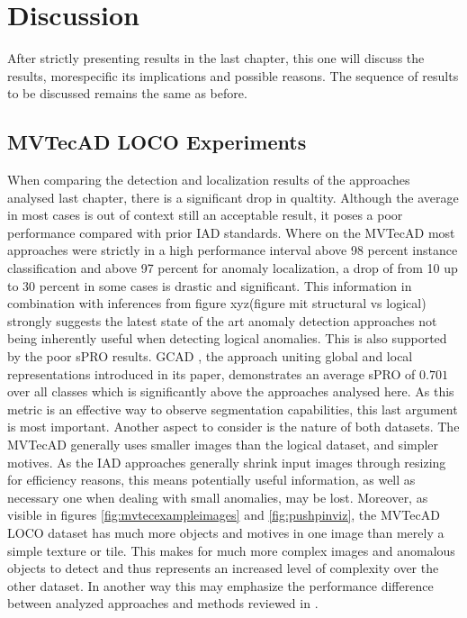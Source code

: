 \chapter{Discussion}
\label{chap:results}

After strictly presenting results in the last chapter, this one will discuss the results, morespecific its implications and possible reasons. 
The sequence of results to be discussed remains the same as before.


\section{MVTecAD LOCO Experiments}
\label{sec:locoresultssota}

When comparing the detection and localization results of the approaches analysed last chapter, there is a significant drop in qualtity. 
Although the average in most cases is out of context still an acceptable result, it poses a poor performance compared with prior 
IAD standards. Where on the MVTecAD \cite{MVTEC_Bergmann_2021} most approaches were strictly in a high performance interval above 98 percent 
instance classification and above 97 percent for anomaly localization, a drop of from 10 up to 30 percent in some cases is drastic and significant. 
This information in combination with inferences from figure xyz(figure mit structural vs logical) strongly suggests the latest state of 
the art anomaly detection approaches not being inherently useful when detecting logical anomalies. This is also supported by the 
poor sPRO results. GCAD \cite{LOCODentsAndScratchesBergmann2022}, the approach uniting global and local representations introduced in its 
paper, demonstrates an average sPRO of $0.701$ over all classes which is significantly above the approaches analysed here. As this metric 
is an effective way to observe segmentation capabilities, this last argument is most important. \newline
Another aspect to consider is the nature of both datasets. The MVTecAD \cite{MVTEC_Bergmann_2021} generally uses smaller images than the 
logical dataset, and simpler motives. As the IAD approaches generally shrink input images through resizing for efficiency reasons, 
this means potentially useful information, as well as necessary one when dealing with small anomalies, may be lost. 
Moreover, as visible in figures \ref{fig:mvtecexampleimages} and \ref{fig:pushpinviz}, the MVTecAD LOCO dataset 
has much more objects and motives in one image than merely a simple texture or tile. This makes for much more complex images and anomalous objects 
to detect and thus represents an increased level of complexity over the other dataset. In another way this may emphasize the performance 
difference between analyzed approaches and methods reviewed in \cite{LOCODentsAndScratchesBergmann2022}. \newline


